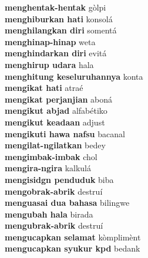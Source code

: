 \textbf{ menghentak-hentak  } gòlpi \\
\textbf{ menghiburkan hati  } konsolá \\
\textbf{ menghilangkan diri  } somentá \\
\textbf{ menghinap-hinap  } weta \\
\textbf{ menghindarkan diri  } evitá \\
\textbf{ menghirup udara  } hala \\
\textbf{ menghitung keseluruhannya  } konta \\
\textbf{ mengikat hati  } atraé \\
\textbf{ mengikat perjanjian  } aboná \\
\textbf{ mengikut abjad  } alfabétiko \\
\textbf{ mengikut keadaan  } adjust \\
\textbf{ mengikuti hawa nafsu  } bacanal \\
\textbf{ mengilat-ngilatkan  } bedey \\
\textbf{ mengimbak-imbak  } chol \\
\textbf{ mengira-ngira  } kalkulá \\
\textbf{ mengisidgn penduduk  } biba \\
\textbf{ mengobrak-abrik  } destruí \\
\textbf{ menguasai dua bahasa  } bilingwe \\
\textbf{ mengubah hala  } birada \\
\textbf{ mengubrak-abrik  } destruí \\
\textbf{ mengucapkan selamat  } kòmplimènt \\
\textbf{ mengucapkan syukur kpd  } bedank \\
